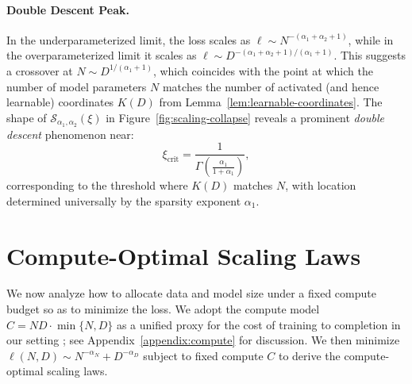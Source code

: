 \documentclass[11pt]{article}
\theoremstyle{plain}
\theoremstyle{definition}
\theoremstyle{remark}
\newcommand{\JSCheck}[1]{#1}
\begin{document}
\vspace{-2mm}

\paragraph{Double Descent Peak.} \JSCheck{In the underparameterized limit, the loss scales as \( \ell \sim N^{-(\alpha_1+\alpha_2+1)} \), while in the overparameterized limit it scales as \( \ell \sim D^{-(\alpha_1+\alpha_2+1)/(\alpha_1+1)} \).} This suggests a crossover at \( N \sim D^{1/(\alpha_1+1)} \), which coincides with the point at which the number of model parameters $N$ matches the number of activated (and hence learnable) coordinates \( K(D) \) from Lemma~\ref{lem:learnable-coordinates}. The shape of \( \mathcal{S}_{\alpha_1, \alpha_2} (\xi) \) in Figure~\ref{fig:scaling-collapse} reveals a prominent \emph{double descent} phenomenon near:
\begin{equation}
\xi_{\mathrm{crit}} = \frac{1}{\Gamma\left( \frac{\alpha_1}{1 + \alpha_1} \right)},
\end{equation}
corresponding to the  threshold where $K(D)$ matches $N$\JSCheck{, with location determined universally by the sparsity exponent \(\alpha_1\).}  %





\section{Compute-Optimal Scaling Laws}
\label{sec:compute-optimal}
\JSCheck{We now analyze how to allocate data and model size under a fixed compute budget so as to minimize the loss. We adopt the compute model $C = N D \cdot \min\{N, D\}$ as a unified proxy for the cost of training to completion in our setting%
; see Appendix~\ref{appendix:compute} for discussion. We then minimize $\ell(N,D)\sim N^{-\alpha_N}+D^{-\alpha_D}$ subject to fixed compute $C$ to derive the compute-optimal scaling laws.}
\end{document}
